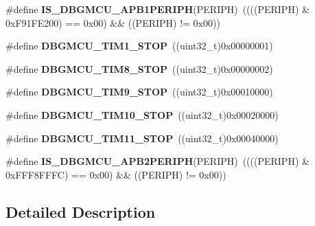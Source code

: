 \begin{DoxyCompactItemize}
\item 
\hypertarget{group___d_b_g_m_c_u___exported___constants_ga10783f4e13d74c8a7516587e8d9cdcac}{\#define {\bfseries I\-S\-\_\-\-D\-B\-G\-M\-C\-U\-\_\-\-A\-P\-B1\-P\-E\-R\-I\-P\-H}(P\-E\-R\-I\-P\-H)~((((P\-E\-R\-I\-P\-H) \& 0x\-F91\-F\-E200) == 0x00) \&\& ((\-P\-E\-R\-I\-P\-H) != 0x00))}\label{group___d_b_g_m_c_u___exported___constants_ga10783f4e13d74c8a7516587e8d9cdcac}

\item 
\hypertarget{group___d_b_g_m_c_u___exported___constants_ga017fb3101a3569426e82b066cb2f8848}{\#define {\bfseries D\-B\-G\-M\-C\-U\-\_\-\-T\-I\-M1\-\_\-\-S\-T\-O\-P}~((uint32\-\_\-t)0x00000001)}\label{group___d_b_g_m_c_u___exported___constants_ga017fb3101a3569426e82b066cb2f8848}

\item 
\hypertarget{group___d_b_g_m_c_u___exported___constants_gaa66feea7d5f2c253fe3f431f9dd4bd1e}{\#define {\bfseries D\-B\-G\-M\-C\-U\-\_\-\-T\-I\-M8\-\_\-\-S\-T\-O\-P}~((uint32\-\_\-t)0x00000002)}\label{group___d_b_g_m_c_u___exported___constants_gaa66feea7d5f2c253fe3f431f9dd4bd1e}

\item 
\hypertarget{group___d_b_g_m_c_u___exported___constants_ga560c557a0d0839dba04f7f2b47851109}{\#define {\bfseries D\-B\-G\-M\-C\-U\-\_\-\-T\-I\-M9\-\_\-\-S\-T\-O\-P}~((uint32\-\_\-t)0x00010000)}\label{group___d_b_g_m_c_u___exported___constants_ga560c557a0d0839dba04f7f2b47851109}

\item 
\hypertarget{group___d_b_g_m_c_u___exported___constants_ga1f0ae2f78e1f9d7eb819bf49b13b5327}{\#define {\bfseries D\-B\-G\-M\-C\-U\-\_\-\-T\-I\-M10\-\_\-\-S\-T\-O\-P}~((uint32\-\_\-t)0x00020000)}\label{group___d_b_g_m_c_u___exported___constants_ga1f0ae2f78e1f9d7eb819bf49b13b5327}

\item 
\hypertarget{group___d_b_g_m_c_u___exported___constants_gade03e5368c3bf8a2f43fc046f1d87f30}{\#define {\bfseries D\-B\-G\-M\-C\-U\-\_\-\-T\-I\-M11\-\_\-\-S\-T\-O\-P}~((uint32\-\_\-t)0x00040000)}\label{group___d_b_g_m_c_u___exported___constants_gade03e5368c3bf8a2f43fc046f1d87f30}

\item 
\hypertarget{group___d_b_g_m_c_u___exported___constants_ga3ed84495007a409cad90734040be900e}{\#define {\bfseries I\-S\-\_\-\-D\-B\-G\-M\-C\-U\-\_\-\-A\-P\-B2\-P\-E\-R\-I\-P\-H}(P\-E\-R\-I\-P\-H)~((((P\-E\-R\-I\-P\-H) \& 0x\-F\-F\-F8\-F\-F\-F\-C) == 0x00) \&\& ((\-P\-E\-R\-I\-P\-H) != 0x00))}\label{group___d_b_g_m_c_u___exported___constants_ga3ed84495007a409cad90734040be900e}

\end{DoxyCompactItemize}


\subsection{Detailed Description}
